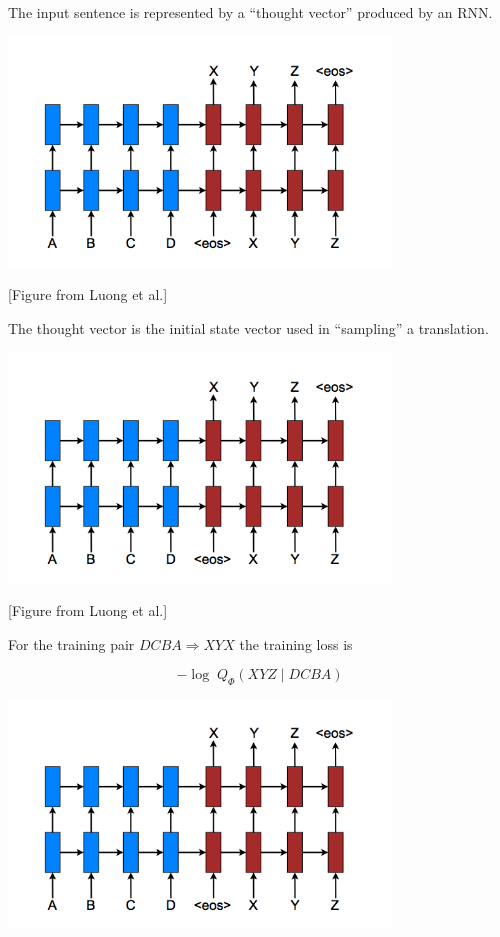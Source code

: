 {\vfill
The input sentence is represented by a ``thought vector'' produced by an RNN.


\centerline{\includegraphics[width = 4in]{../images/SeqToSeq}}

\centerline{\large [Figure from Luong et al.]}

\vfill
The thought vector is the initial state vector used in ``sampling'' a translation.


\centerline{\includegraphics[width = 4in]{../images/SeqToSeq}}

\centerline{\large [Figure from Luong et al.]}

\vfill
For the training pair $DCBA \Rightarrow XYX$ the training loss is

\vfill
$$- \log\;Q_\Phi(XYZ\;|\;DCBA)$$



\centerline{\includegraphics[width = 4in]{../images/SeqToSeq}}

}
